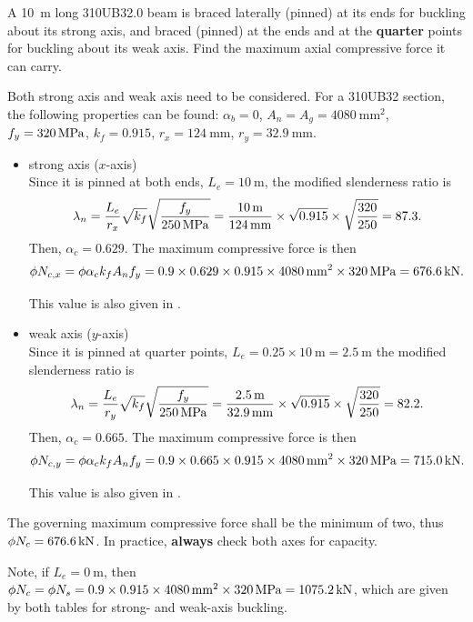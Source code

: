 \begin{exmp}
A \SI{10}{\meter} long 310UB32.0 beam is braced laterally (pinned) at its ends for buckling about its strong axis, and braced (pinned) at the ends and at the \textbf{quarter} points for buckling about its weak axis. Find the maximum axial compressive force it can carry.
\end{exmp}
\begin{solution}
Both strong axis and weak axis need to be considered. For a 310UB32 section, the following properties can be found: $\alpha_b=0$, $A_n=A_g=\SI{4080}{\mm^2}$, $f_y=\SI{320}{\mega\pascal}$, $k_f=0.915$, $r_x=\SI{124}{\mm}$, $r_y=\SI{32.9}{\mm}$.
\begin{itemize}
\item strong axis ($x$-axis)\\
Since it is pinned at both ends, $L_e=\SI{10}{\meter}$, the modified slenderness ratio is
\begin{gather*}
\lambda_n=\dfrac{L_e}{r_x}\sqrt{k_f}\sqrt{\dfrac{f_y}{\SI{250}{\mega\pascal}}}=\dfrac{\SI{10}{\meter}}{\SI{124}{\milli\meter}}\times\sqrt{0.915}\times\sqrt{\dfrac{320}{250}}=87.3.
\end{gather*}
Then, $\alpha_c=0.629$. The maximum compressive force is then
\begin{gather*}
\phi{}N_{c,x}=\phi\alpha_ck_fA_nf_y=0.9\times0.629\times0.915\times\SI{4080}{\milli\meter^2}\times\SI{320}{\mega\pascal}=\SI{676.6}{\kilo\newton}.
\end{gather*}

This value is also given in .
\item weak axis ($y$-axis)\\
Since it is pinned at quarter points, $L_e=0.25\times\SI{10}{\meter}=\SI{2.5}{\meter}$ the modified slenderness ratio is
\begin{gather*}
\lambda_n=\dfrac{L_e}{r_y}\sqrt{k_f}\sqrt{\dfrac{f_y}{\SI{250}{\mega\pascal}}}=\dfrac{\SI{2.5}{\meter}}{\SI{32.9}{\milli\meter}}\times\sqrt{0.915}\times\sqrt{\dfrac{320}{250}}=82.2.
\end{gather*}
Then, $\alpha_c=0.665$. The maximum compressive force is then
\begin{gather*}
\phi{}N_{c,y}=\phi\alpha_ck_fA_nf_y=0.9\times0.665\times0.915\times\SI{4080}{\milli\meter^2}\times\SI{320}{\mega\pascal}=\SI{715.0}{\kilo\newton}.
\end{gather*}

This value is also given in .
\end{itemize}
The governing maximum compressive force shall be the minimum of two, thus $\phi{}N_c=\SI{676.6}{\kilo\newton}$. In practice, \textbf{always} check both axes for capacity.

Note, if $L_e=\SI{0}{\m}$, then $\phi{}N_c=\phi{}N_s=0.9\times0.915\times\SI{4080}{\milli\meter^2}\times\SI{320}{\mega\pascal}=\SI{1075.2}{\kilo\newton}$, which are given by both tables for strong- and weak-axis buckling.
\end{solution}
